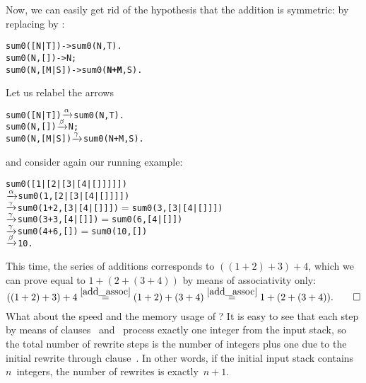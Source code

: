 Now, we can easily get rid of the hypothesis that the addition is
symmetric: by replacing  by :
\begin{alltt}
sum0([N|T])   -> sum0(N,T).
sum0(N,   []) -> N;
sum0(N,[M|S]) -> sum0(\textbf{N+M},S).
\end{alltt}
Let us relabel the arrows
\begin{alltt}
sum0([N|T])   \(\xrightarrow{\smash[t]{\alpha}}\) sum0(N,T).
sum0(N,   []) \(\xrightarrow{\smash[t]{\beta}}\) N;
sum0(N,[M|S]) \(\xrightarrow{\smash[t]{\gamma}}\) sum0(N+M,S).
\end{alltt}
and consider again our running example:
\begin{alltt}
sum0([1|[2|[3|[4|[]]]]])
          \(\xrightarrow{\smash[t]{\alpha}}\) sum0(1,[2|[3|[4|[]]]])
          \(\xrightarrow{\smash[t]{\gamma}}\) sum0(1+2,[3|[4|[]]])   \(=\) sum0(3,[3|[4|[]]])
          \(\xrightarrow{\smash[t]{\gamma}}\) sum0(3+3,[4|[]])       \(=\) sum0(6,[4|[]])
          \(\xrightarrow{\smash[t]{\gamma}}\) sum0(4+6,[])           \(=\) sum0(10,[])
          \(\xrightarrow{\smash[t]{\beta}}\) 10\textrm{.}
\end{alltt}
This time, the series of additions corresponds to \(((1+2)+3)+4\),
which we can prove equal to \(1+(2+(3+4))\) by means of associativity
only:
\begin{equation*}
((1 + 2) + 3) + 4
  \mathrel{\stackrel{\smash{\ref{add_assoc}}}{=}} (1 + 2) + (3 + 4)
  \mathrel{\stackrel{\smash{\ref{add_assoc}}}{=}} 1 + (2 + (3 + 4)).\qquad\Box
\end{equation*}
What about the speed and the memory usage of ? It is
easy to see that each step by means of clauses~\clause{\beta}
and~\clause{\gamma} process exactly one integer from the input stack,
so the total number of rewrite steps is the number of integers plus
one due to the initial rewrite through clause~\clause{\alpha}. In
other words, if the initial input stack contains \(n\)~integers, the
number of rewrites is exactly~\(n+1\).

